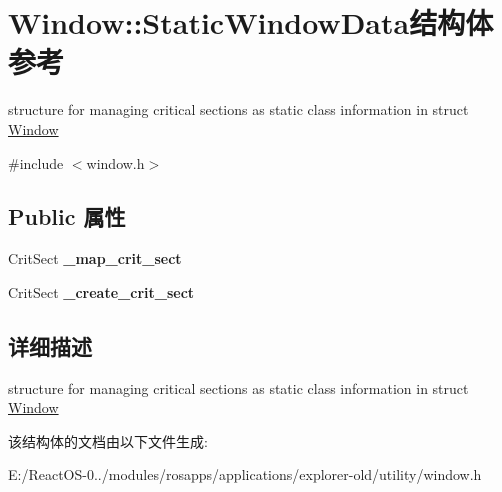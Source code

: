 \hypertarget{struct_window_1_1_static_window_data}{}\section{Window\+:\+:Static\+Window\+Data结构体 参考}
\label{struct_window_1_1_static_window_data}


structure for managing critical sections as static class information in struct \hyperlink{struct_window}{Window}  




{\ttfamily \#include $<$window.\+h$>$}

\subsection*{Public 属性}
\begin{DoxyCompactItemize}
\item 
\mbox{\label{struct_window_1_1_static_window_data_a809a852f14f3fd7c2a5df6e470cc817a}} 
Crit\+Sect {\bfseries \+\_\+map\+\_\+crit\+\_\+sect}
\item 
\mbox{\label{struct_window_1_1_static_window_data_a392db8801002c5ca28367dabe5073967}} 
Crit\+Sect {\bfseries \+\_\+create\+\_\+crit\+\_\+sect}
\end{DoxyCompactItemize}


\subsection{详细描述}
structure for managing critical sections as static class information in struct \hyperlink{struct_window}{Window} 

该结构体的文档由以下文件生成\+:\begin{DoxyCompactItemize}
\item 
E\+:/\+React\+O\+S-\/0../modules/rosapps/applications/explorer-\/old/utility/window.\+h\end{DoxyCompactItemize}
